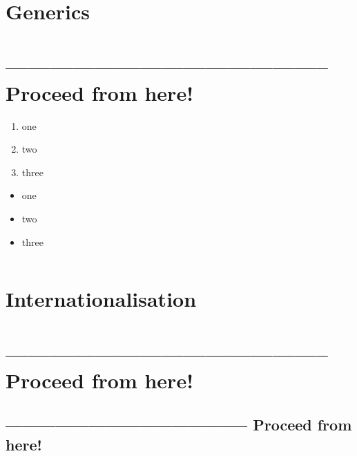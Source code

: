 \section{Generics}\label{sec:GenericTypes}

\hrulefill\newpage 
\section{-------------------------------------------- Proceed from here!}
\lipsum[1]

\begin{enumerate}[label=P\arabic*.]
\item{one}
\item{two}
\item{three}
\end{enumerate}

\begin{itemize}[nosep]
\item{one}
\item{two}
\item{three}
\end{itemize}

\begin{lstlisting}[numbers=left]
\end{lstlisting}



\section{Internationalisation}\label{sec:I18n}
\hrulefill\newpage 
\section{-------------------------------------------- Proceed from here!}
\subsection{-------------------------------------------- Proceed from here!}
